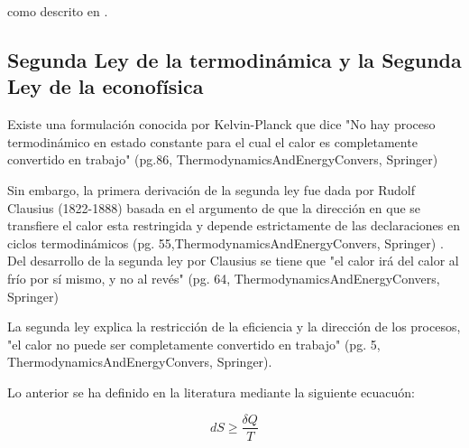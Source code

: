 
como descrito en \citep{Huang2021}.



\subsection{Segunda Ley de la termodinámica y la Segunda Ley de la econofísica} 


%



Existe una formulación conocida por Kelvin-Planck que dice "No hay proceso termodinámico en estado constante para el cual el calor es completamente convertido en trabajo" (pg.86, ThermodynamicsAndEnergyConvers, Springer)

Sin embargo, la primera derivación de la segunda ley fue dada por Rudolf Clausius (1822-1888) basada en el argumento de que la dirección en que se transfiere el calor esta restringida y depende estrictamente de las declaraciones en ciclos termodinámicos (pg. 55,ThermodynamicsAndEnergyConvers, Springer) . Del desarrollo de la segunda ley por Clausius se tiene que "el calor irá del calor al frío por sí mismo, y no al revés" (pg. 64, ThermodynamicsAndEnergyConvers, Springer)

La segunda ley explica la restricción de la eficiencia y la dirección de los procesos, "el calor no puede ser completamente convertido en trabajo" (pg. 5, ThermodynamicsAndEnergyConvers, Springer). 

Lo anterior se ha definido en la literatura mediante la siguiente ecuacuón:

\begin{equation}
dS \geqslant \frac{\delta Q}{T}
\end{equation}

